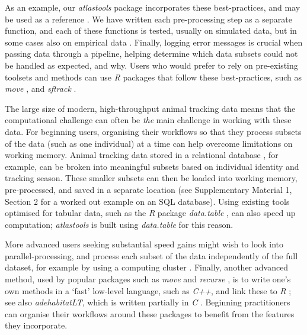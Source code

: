 \begin{refsection}[sorting=nyt]
    As an example, our \textit{atlastools} package incorporates these best-practices, and may be used as a reference \citep[][]{gupte2020a}.
    We have written each pre-processing step as a separate function, and each of these functions is tested, usually on simulated data, but in some cases also on empirical data \citep[][see the directory \textit{tests/} in the associated Zenodo repository]{wickham2015}.
    Finally, logging error messages is crucial when passing data through a pipeline, helping determine which data subsets could not be handled as expected, and why.
    Users who would prefer to rely on pre-existing toolsets and methods can use \textit{R} packages that follow these best-practices, such as \textit{move} \citep{kranstauber2011}, and \textit{sftrack} \citep{boone2020}.

    The large size of modern, high-throughput animal tracking data means that the computational challenge can often be \textit{the} main challenge in working with these data.
    For beginning users, organising their workflows so that they process subsets of the data (such as one individual) at a time can help overcome limitations on working memory.
    Animal tracking data stored in a relational database \citep[e.g. SQL databases][]{codd1970}, for example, can be broken into meaningful subsets based on individual identity and tracking season.
    These smaller subsets can then be loaded into working memory, pre-processed, and saved in a separate location (see Supplementary Material 1, Section 2 for a worked out example on an SQL database).
    Using existing tools optimised for tabular data, such as the \textit{R} package \textit{data.table} \citep{dowle2020}, can also speed up computation; \textit{atlastools} is built using \textit{data.table} for this reason.

    More advanced users seeking substantial speed gains might wish to look into parallel-processing, and process each subset of the data independently of the full dataset, for example by using a computing cluster \citep[see also][for an alternative]{zjdai2021}.
    Finally, another advanced method, used by popular packages such as \textit{move} \citep{kranstauber2011} and \textit{recurse} \citep{bracis2018}, is to write one's own methods in a `fast' low-level language, such as \textit{C++}, and link these to \textit{R} \citep[][]{eddelbuettel2013}; see also \textit{adehabitatLT}, which is written partially in \textit{C} \citep{calenge2006}.
    Beginning practitioners can organise their workflows around these packages to benefit from the features they incorporate.


\end{refsection}

